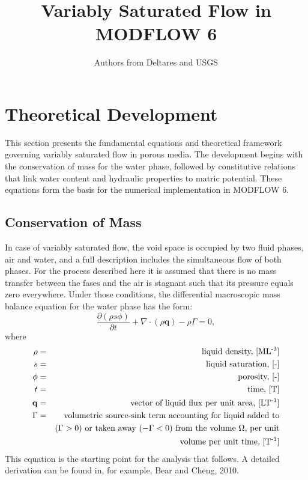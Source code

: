 \documentclass[fleqn]{article}
\author{Authors from Deltares and USGS}
\begin{document}
\title{Variably Saturated Flow in MODFLOW 6}
\maketitle

\tableofcontents

\section{Theoretical Development}
This section presents the fundamental equations and theoretical framework 
governing variably saturated flow in porous media. The development begins 
with the conservation of mass for the water phase, followed by constitutive 
relations that link water content and hydraulic properties to matric potential. 
These equations form the basis for the numerical implementation in MODFLOW 6.

\subsection{Conservation of Mass}
In case of variably saturated flow, the void space is occupied by 
two fluid phases, air and water, and a full description includes
the simultaneous flow of both phases. For the process described here
it is assumed that there is no mass transfer between the fases and
the air is stagnant such that its pressure equals zero everywhere.
Under those conditions, the differential macroscopic mass balance 
equation for the water phase has the form:
\begin{equation}
  \frac{\partial (\rho s \phi)}{\partial t} +
  \nabla \cdot (\rho \mathbf{q}) -
  \rho \Gamma = 0,
  \label{eq-balance-equation}
\end{equation}
where
\begin{eqnarray*}
  \rho &=& \textrm{liquid density, [ML\textsuperscript{-3}]} \\
  s &=& \textrm{liquid saturation, [-]} \\
  \phi &=& \textrm{porosity, [-]} \\
  t &=& \textrm{time, [T]} \\
  \mathbf{q} &=& \textrm{vector of liquid flux per unit area, [LT\textsuperscript{-1}]} \\
  \Gamma &=& \textrm{volumetric source-sink term accounting for liquid added to} \\
  && \textrm{($\Gamma > 0$) or taken away ($-\Gamma < 0$) from the volume $\Omega$, per unit} \\
  && \textrm{volume per unit time, [T\textsuperscript{-1}]}
\end{eqnarray*}
This equation is the starting point for the analysis that follows. 
A detailed derivation can be found in, for example, Bear and Cheng, 2010.
\end{document}
